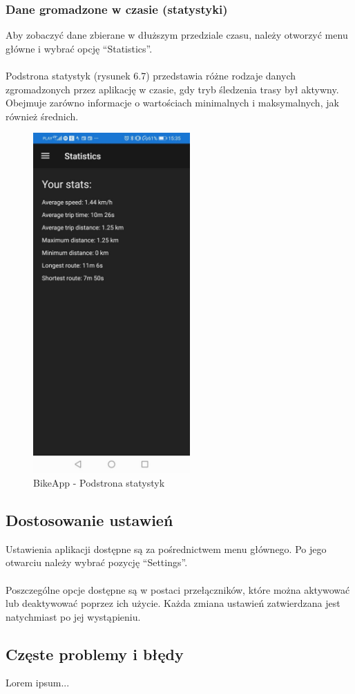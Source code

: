 \subsubsection{Dane gromadzone w czasie (statystyki)} %
Aby zobaczyć dane zbierane w dłuższym przedziale czasu, należy otworzyć menu główne i wybrać opcję ``Statistics''.\\
\\
Podstrona statystyk (rysunek 6.7) przedstawia różne rodzaje danych zgromadzonych przez aplikację w czasie, gdy tryb śledzenia trasy był aktywny. Obejmuje zarówno informacje o wartościach minimalnych i maksymalnych, jak również średnich.

\begin{figure}[!htb]
	\begin{center}
		\includegraphics[width=6cm]{rys/instructions-stats.jpg}
		\caption{BikeApp - Podstrona statystyk}
		\label{rys:BikeApp - Podstrona statystyk}
	\end{center}
\end{figure}

\subsection{Dostosowanie ustawień} %
Ustawienia aplikacji dostępne są za pośrednictwem menu głównego. Po jego otwarciu należy wybrać pozycję ``Settings''.\\
\\
Poszczególne opcje dostępne są w postaci przełączników, które można aktywować lub deaktywować poprzez ich użycie. Każda zmiana ustawień zatwierdzana jest natychmiast po jej wystąpieniu.

\subsection{Częste problemy i błędy} %
Lorem ipsum...


